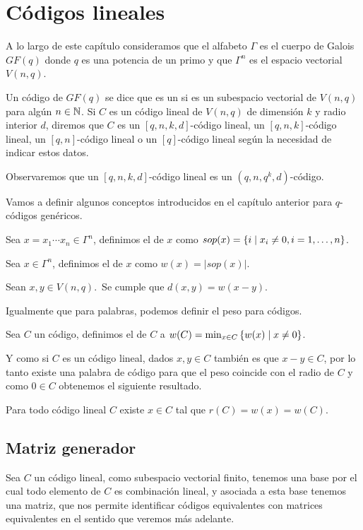 \section{Códigos lineales}
A lo largo de este capítulo consideramos que el alfabeto $\Gamma$ es el cuerpo de Galois $GF(q)$ donde $q$ es una potencia de un primo y que $\Gamma^n$ es el espacio vectorial $V(n, q)$.
\begin{definition}
	Un código de $GF(q)$ se dice que es un  si es un subespacio vectorial de $V(n, q)$ para algún $n\in\mathbb{N}$.
	Si $C$ es un código lineal de $V(n, q)$ de dimensión $k$ y radio interior $d$, diremos que $C$ es un $[q, n, k, d]$-código lineal, un $[q, n, k]$-código lineal, un $[q, n]$-código lineal o un $[q]$-código lineal según la necesidad de indicar estos datos.
\end{definition}
Observaremos que un $[q, n, k, d]$-código lineal es un $(q, n, q^k, d)$-código.

Vamos a definir algunos conceptos introducidos en el capítulo anterior para $q$-códigos genéricos.
\begin{definition}
	Sea $x=x_1\cdots x_n\in\Gamma^n$, definimos el  de $x$ como $sop(x)=\left\{i\mid x_i\neq 0, i=1,\dots, n\right\}$.
\end{definition}

\begin{definition}
	Sea $x\in\Gamma^n$, definimos el  de $x$ como $w(x)=|sop(x)|$.
\end{definition}
\begin{lemma}
	Sean $x,y\in V(n,q)$.\ Se cumple que $d(x,y)=w(x-y)$.
\end{lemma}
Igualmente que para palabras, podemos definir el peso para códigos.
\begin{definition}
	Sea $C$ un código, definimos el  de $C$ a $w(C)=\min_{x\in C}\left\{w(x)\mid x\neq 0\right\}$.
\end{definition}
Y como si $C$ es un código lineal, dados $x,y\in C$ también es que $x-y\in C$, por lo tanto existe una palabra de código para que el peso coincide con el radio de $C$ y como $0\in C$ obtenemos el siguiente resultado.
\begin{lemma}
	\label{res:distancia-peso}
	Para todo código lineal $C$ existe $x\in C$ tal que $r(C)=w(x)=w(C)$.
\end{lemma}

\subsection{Matriz generador}
Sea $C$ un código lineal, como subespacio vectorial finito, tenemos una base por el cual todo elemento de $C$ es combinación lineal, y asociada a esta base tenemos una matriz, que nos permite identificar códigos equivalentes con matrices equivalentes en el sentido que veremos más adelante.

